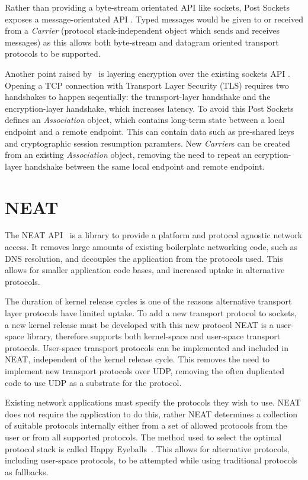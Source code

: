 Rather than providing a byte-stream orientated API like sockets, Post Sockets exposes a message-orientated API .
Typed messages would be given to or received from a \emph{Carrier} (protocol stack-independent object which sends and
receives messages) as this allows both byte-stream and datagram oriented transport protocols to be supported.

Another point raised by~\cite{kuhlewind_postsocketsabstract_} is layering encryption over the existing sockets API .
Opening a TCP connection with Transport Layer Security (TLS) requires two handshakes to happen seqentially: the
transport-layer handshake and the encryption-layer handshake, which increases latency.
To avoid this Post Sockets defines an \emph{Association} object, which contains long-term state between a local endpoint
and a remote endpoint.
This can contain data such as pre-shared keys and cryptographic session resumption paramters.
New \emph{Carrier}s can be created from an existing \emph{Association} object, removing the need to repeat an
ecryption-layer handshake between the same local endpoint and remote endpoint.

\section{NEAT}\label{sec:neat}
The NEAT API~\citep{khademi_neatplatformprotocolindependent_2017} is a library to provide a platform and protocol
agnostic network access.
It removes large amounts of existing boilerplate networking code, such as DNS resolution, and decouples the application
from the protocols used.
This allows for smaller application code bases, and increased uptake in alternative protocols.

The duration of kernel release cycles is one of the reasons alternative transport layer protocols have limited uptake.
To add a new transport protocol to sockets, a new kernel release must be developed with this new protocol
NEAT is a user-space library, therefore supports both kernel-space and user-space transport protocols.
User-space transport protocols can be implemented and included in NEAT, independent of the kernel release cycle.
This removes the need to implement new transport protocols over UDP, removing the often duplicated code to use UDP
as a substrate for the protocol.

Existing network applications must specify the protocols they wish to use.
NEAT does not require the application to do this, rather NEAT determines a collection of suitable protocols internally
either from a set of allowed protocols from the user or from all supported protocols.
The method used to select the optimal protocol stack is called Happy Eyeballs~\citep{pauly_happyeyeballsversion_}.
This allows for alternative protocols, including user-space protocols, to be attempted while using traditional protocols
as fallbacks.

